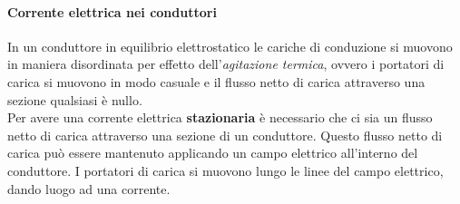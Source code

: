 \documentclass[12pt]{report}
\begin{document}
	\paragraph{Corrente elettrica nei conduttori} In un conduttore in equilibrio elettrostatico le cariche di conduzione si muovono in maniera disordinata per effetto dell'\textit{agitazione termica}, ovvero i portatori di carica si muovono in modo casuale e il flusso netto di carica attraverso una sezione qualsiasi è nullo. \\
	Per avere una corrente elettrica \textbf{stazionaria} è necessario che ci sia un flusso netto di carica attraverso una sezione di un conduttore. Questo flusso netto di carica può essere mantenuto applicando un campo elettrico all'interno del conduttore. I portatori di carica si muovono lungo le linee del campo elettrico, dando luogo ad una corrente.
\end{document}
